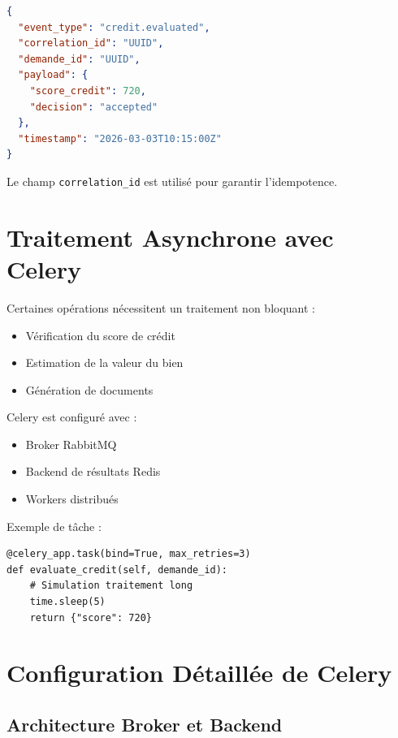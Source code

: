 \documentclass[12pt,a4paper]{article}
\begin{document}
\begin{lstlisting}[language=json]
{
  "event_type": "credit.evaluated",
  "correlation_id": "UUID",
  "demande_id": "UUID",
  "payload": {
    "score_credit": 720,
    "decision": "accepted"
  },
  "timestamp": "2026-03-03T10:15:00Z"
}
\end{lstlisting}

Le champ \texttt{correlation\_id} est utilisé pour garantir l’idempotence.

\section{Traitement Asynchrone avec Celery}

Certaines opérations nécessitent un traitement non bloquant :

\begin{itemize}
\item Vérification du score de crédit
\item Estimation de la valeur du bien
\item Génération de documents
\end{itemize}

Celery est configuré avec :

\begin{itemize}
\item Broker RabbitMQ
\item Backend de résultats Redis
\item Workers distribués
\end{itemize}

Exemple de tâche :

\begin{lstlisting}
@celery_app.task(bind=True, max_retries=3)
def evaluate_credit(self, demande_id):
    # Simulation traitement long
    time.sleep(5)
    return {"score": 720}
\end{lstlisting}

\section{Configuration Détaillée de Celery}

\subsection{Architecture Broker et Backend}
\end{document}
